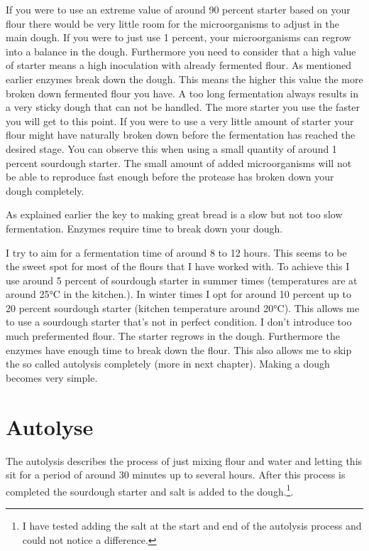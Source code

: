 If you were to use an extreme value of around 90 percent starter based on your flour there
would be very little room for the microorganisms to adjust in the main dough.
If you were to just use 1 percent, your microorganisms can regrow into a
balance in the dough. Furthermore you need to consider that a high value
of starter means a high inoculation with already fermented flour. As
mentioned earlier enzymes break down the dough. This means the higher this
value the more broken down fermented flour you have. A too long fermentation
always results in a very sticky dough that can not be handled. The more
starter you use the faster you will get to this point. If you were to use a
very little amount of starter your flour might have naturally broken down
before the fermentation has reached the desired stage. You can observe this
when using a small quantity of around 1 percent sourdough starter. The small
amount of added microorganisms will not be able to reproduce fast enough
before the protease has broken down your dough completely.

As explained earlier the key to making great bread is a slow but not too slow
fermentation.
Enzymes require time to break down your dough.

I try to aim for a fermentation time of around 8 to 12 hours. This seems to be
the sweet spot for most of the flours that I have worked with. To achieve this
I use around 5 percent of sourdough starter in summer times (temperatures are
at around 25°C in the kitchen.). In winter times I opt for around 10 percent
up to 20 percent sourdough starter (kitchen temperature around 20°C). This
allows me to use a sourdough starter that's not in perfect condition. I don't
introduce too much prefermented flour. The starter regrows in the dough.
Furthermore the enzymes have enough time to break down the flour. This also
allows me to skip the so called autolysis completely (more in next chapter).
Making a dough becomes very simple.

\section{Autolyse}

The autolysis describes the process of just mixing flour and water and letting
this sit for a period of around 30 minutes up to several hours. After this
process is completed the sourdough starter and salt is added to the
dough.\footnote{I have tested adding the salt at the start and end of the
autolysis process and could not notice a difference.}.

